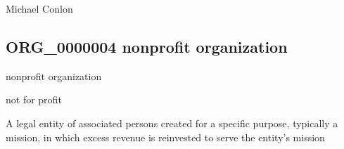 \documentclass[letterpaper,10pt,english]{sphinxmanual}
\begin{document}
\begin{sphinxShadowBox}

\sphinxAtStartPar
{}
\end{sphinxShadowBox}

\begin{sphinxShadowBox}

\sphinxAtStartPar
Michael Conlon 
\end{sphinxShadowBox}
\begin{quote}

\ignorespaces \end{quote}


\subsection{ORG\_0000004 \sphinxhyphen{} nonprofit organization}
\label{\detokenize{doc-ORG_0000004:org-0000004-nonprofit-organization}}\label{\detokenize{doc-ORG_0000004:index-0}}\label{\detokenize{doc-ORG_0000004::doc}}
\begin{sphinxShadowBox}

\sphinxAtStartPar
nonprofit organization
\end{sphinxShadowBox}

\begin{sphinxShadowBox}

\sphinxAtStartPar
not for profit
\end{sphinxShadowBox}

\begin{sphinxShadowBox}

\sphinxAtStartPar
{\hyperref[\detokenize{doc-ORG_0000001::doc}]{}}
\end{sphinxShadowBox}

\begin{sphinxShadowBox}

\sphinxAtStartPar
A legal entity of associated persons created for a specific purpose, typically a mission, in which excess revenue is reinvested to serve the entity’s mission
\end{sphinxShadowBox}
\end{document}
